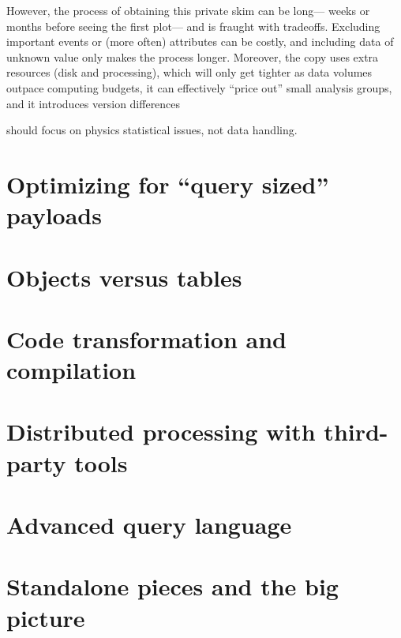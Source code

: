 \documentclass[a4paper]{jpconf}
\begin{document}
However, the process of obtaining this private skim can be long--- weeks or months before seeing the first plot--- and is fraught with tradeoffs. Excluding important events or (more often) attributes can be costly, and including data of unknown value only makes the process longer. Moreover, the copy uses extra resources (disk and processing), which will only get tighter as data volumes outpace computing budgets, it can effectively ``price out'' small analysis groups, and it introduces version differences 

should focus on physics statistical issues, not data handling.




\section{Optimizing for ``query sized'' payloads}

\section{Objects versus tables}

\section{Code transformation and compilation}

\section{Distributed processing with third-party tools}

\section{Advanced query language}

\section{Standalone pieces and the big picture}
\end{document}
